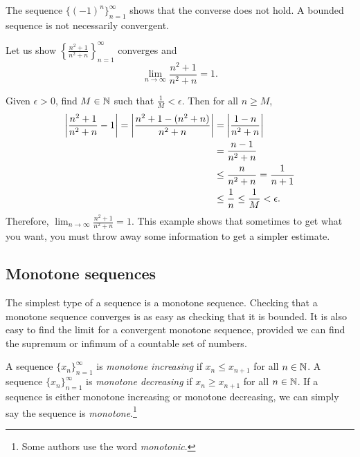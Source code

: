 The sequence $\bigl\{ {(-1)}^n \bigr\}_{n=1}^\infty$ shows that the converse
does not hold.  A bounded sequence is not necessarily convergent.

\begin{example}
Let us show $\left\{ \frac{n^2+1}{n^2+n} \right\}_{n=1}^\infty$ converges and
\begin{equation*}
\lim_{n\to\infty} \frac{n^2+1}{n^2+n} = 1 .
\end{equation*}

Given $\epsilon > 0$,
find $M \in {\mathbb{N}}$ such that $\frac{1}{M} < \epsilon$.  Then for all $n \geq
M$,
\begin{equation*}
\begin{split}
\left\lvert {\frac{n^2+1}{n^2+n} - 1} \right\rvert  =
\left\lvert {\frac{n^2+1 - (n^2+n)}{n^2+n}} \right\rvert
& =
\left\lvert {\frac{1 - n}{n^2+n}} \right\rvert \\
& =
\frac{n-1}{n^2+n} \\
& \leq 
\frac{n}{n^2+n} 
 =
\frac{1}{n+1}  \\
& \leq \frac{1}{n}
\leq \frac{1}{M} < \epsilon .
\end{split}
\end{equation*}
Therefore,
$\lim_{n\to\infty} \frac{n^2+1}{n^2+n} = 1$.
This example shows that sometimes to get what you want, you must throw away
some information to get a simpler estimate.
\end{example}

\subsection{Monotone sequences}

The simplest type of a sequence is a monotone sequence.  Checking that
a monotone sequence converges is as easy as checking that it is bounded.
It is also easy to find
the limit for a convergent
monotone sequence, provided we can find the supremum or infimum
of a countable set of numbers.

\begin{defn}
A sequence $\{ x_n \}_{n=1}^\infty$ is \emph{monotone increasing} if $x_n \leq x_{n+1}$ for all $n \in {\mathbb{N}}$.  
%
A sequence $\{ x_n \}_{n=1}^\infty$ is \emph{monotone decreasing} if $x_n \geq x_{n+1}$ for all $n \in {\mathbb{N}}$.  
%
If a sequence is either monotone increasing or monotone decreasing, we
can simply say the sequence is \emph{monotone}.\footnote{Some
authors use the word \emph{monotonic}.}
\end{defn}

